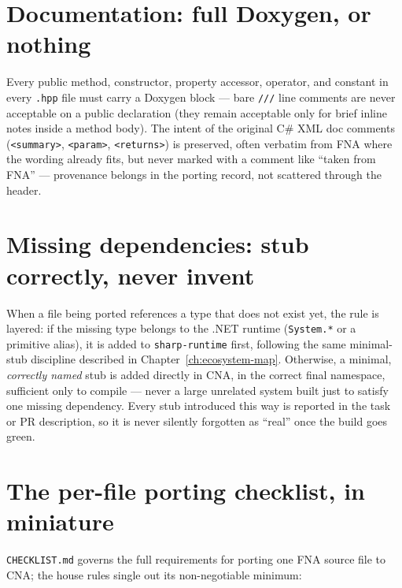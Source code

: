 \section{Documentation: full Doxygen, or nothing}

Every public method, constructor, property accessor, operator, and constant in every
\texttt{.hpp} file must carry a Doxygen block --- bare \texttt{///} line comments are never
acceptable on a public declaration (they remain acceptable only for brief inline notes inside
a method body). The intent of the original C\# XML doc comments (\texttt{<summary>},
\texttt{<param>}, \texttt{<returns>}) is preserved, often verbatim from FNA where the wording
already fits, but never marked with a comment like ``taken from FNA'' --- provenance belongs
in the porting record, not scattered through the header.

\section{Missing dependencies: stub correctly, never invent}
\label{sec:missing-deps}

When a file being ported references a type that does not exist yet, the rule is layered:
if the missing type belongs to the .NET runtime (\texttt{System.*} or a primitive alias), it
is added to \texttt{sharp-runtime} first, following the same minimal-stub discipline
described in Chapter~\ref{ch:ecosystem-map}. Otherwise, a minimal, \emph{correctly named}
stub is added directly in CNA, in the correct final namespace, sufficient only to compile ---
never a large unrelated system built just to satisfy one missing dependency. Every stub
introduced this way is reported in the task or PR description, so it is never silently
forgotten as ``real'' once the build goes green.

\section{The per-file porting checklist, in miniature}

\texttt{CHECKLIST.md} governs the full requirements for porting one FNA source file to CNA;
the house rules single out its non-negotiable minimum:

